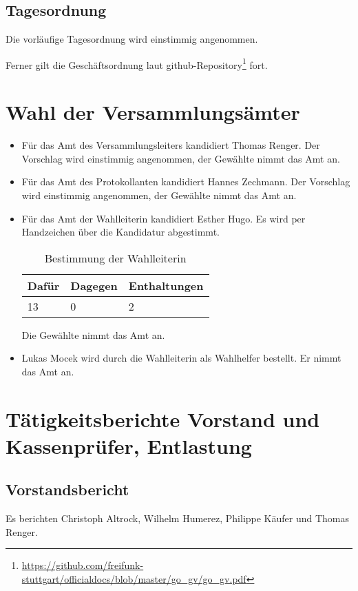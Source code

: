 \documentclass[a4paper]{scrartcl}
\begin{document}
\subsection{Tagesordnung} 
Die vorläufige Tagesordnung wird einstimmig angenommen.

Ferner gilt die Geschäftsordnung laut github-Repository\footnote{\url{https://github.com/freifunk-stuttgart/officialdocs/blob/master/go_gv/go_gv.pdf}} fort.

\section{Wahl der Versammlungsämter}
\begin{itemize}
\item Für das Amt des Versammlungsleiters kandidiert Thomas Renger. Der Vorschlag wird einstimmig angenommen, der Gewählte nimmt das Amt an.
\item Für das Amt des Protokollanten kandidiert Hannes Zechmann. Der Vorschlag wird einstimmig angenommen, der Gewählte nimmt das Amt an.
\item Für das Amt der Wahlleiterin kandidiert Esther Hugo. Es wird per Handzeichen über die Kandidatur abgestimmt.\\
\begin{table}[H]
	\begin{tabularx}{\textwidth}{XXX}
		Dafür & Dagegen & Enthaltungen\\
		\toprule
		13 & 0 & 2\\
	\end{tabularx}
	\caption{Bestimmung der Wahlleiterin}
\end{table}
Die Gewählte nimmt das Amt an.
\item Lukas Mocek wird durch die Wahlleiterin als Wahlhelfer bestellt. Er nimmt das Amt an.
\end{itemize}

\section{Tätigkeitsberichte Vorstand und Kassenprüfer, Entlastung}
\subsection{Vorstandsbericht}
Es berichten Christoph Altrock, Wilhelm Humerez, Philippe Käufer und Thomas Renger.
\end{document}
